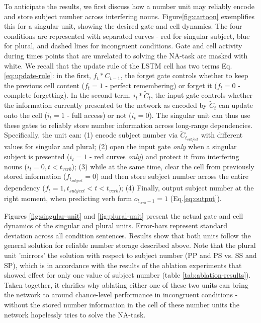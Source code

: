 To anticipate the results, we first discuss how a number unit may reliably encode and store subject number across interfering nouns. Figure\ref{fig:cartoon} exemplifies this for a singular unit, showing the desired gate and cell dynamics. The four conditions are represented with separated curves - red for singular subject, blue for plural, and dashed lines for incongruent conditions. Gate and cell activity during times points that are unrelated to solving the NA-task are masked with white. We recall that the update rule of the LSTM cell has two terms Eq.\ref{eq:update-rule}: in the first, $f_t * C_{t-1}$, the forget gate controls whether to keep the previous cell content ($f_t=1$ - perfect remembering) or forget it ($f_t=0$ - complete forgetting). In the second term, $i_t*\tilde{C}_t$, the input gate controls whether the information currently presented to the network as encoded by $\tilde{C}_t$ can update onto the cell ($i_t=1$ - full access) or not ($i_t=0$). The singular unit can thus use these gates to reliably store number information across long-range dependencies. Specifically, the unit can: (1) encode subject number via $\tilde{C}_{t_{subject}}$ with different values for singular and plural; (2) open the input gate \textit{only} when a singular subject is presented ($i_t=1$ - red curves \textit{only}) and protect it from interfering nouns ($i_t=0, t<t_{verb}$); (3) while at the same time, clear the cell from previously stored information ($f_{t_{subject}}=0$) and then store subject number across the entire dependency ($f_t=1, t_{subject}<t<t_{verb}$); (4) Finally, output subject number at the right moment, when predicting verb form $o_{t_{verb}-1}=1$ (Eq.\ref{eq:output}). 

Figures \ref{fig:singular-unit} and \ref{fig:plural-unit} present the actual gate and cell dynamics of the singular and plural units. Error-bars represent standard deviation across all condition sentences. Results show that both units follow the general solution for reliable number storage described above. Note that the plural unit 'mirrors' the solution with respect to subject number (PP and PS vs. SS and SP), which is in accordance with the results of the ablation experiments that showed effect for only one value of subject number (table \ref{tab:ablation-results}). Taken together, it clarifies why ablating either one of these two units can bring the network to around chance-level performance in incongruent conditions - without the stored number information in the cell of these number units the network hopelessly tries to solve the NA-task.

